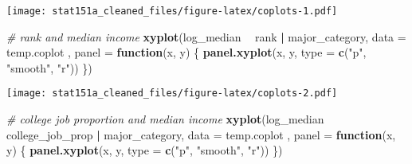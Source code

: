 \documentclass[
]{article}
\newenvironment{Shaded}{\begin{snugshade}}{\end{snugshade}}
\newcommand{\CommentTok}[1]{\textcolor[rgb]{0.56,0.35,0.01}{\textit{#1}}}
\newcommand{\ControlFlowTok}[1]{\textcolor[rgb]{0.13,0.29,0.53}{\textbf{#1}}}
\newcommand{\DataTypeTok}[1]{\textcolor[rgb]{0.13,0.29,0.53}{#1}}
\newcommand{\KeywordTok}[1]{\textcolor[rgb]{0.13,0.29,0.53}{\textbf{#1}}}
\newcommand{\NormalTok}[1]{#1}
\newcommand{\OperatorTok}[1]{\textcolor[rgb]{0.81,0.36,0.00}{\textbf{#1}}}
\newcommand{\StringTok}[1]{\textcolor[rgb]{0.31,0.60,0.02}{#1}}
\begin{document}
\begin{Shaded}
\end{Shaded}

\texttt{[image: stat151a\_cleaned\_files/figure-latex/coplots-1.pdf]}

\begin{Shaded}
\begin{Highlighting}[]
\CommentTok{# rank and median income }
\KeywordTok{xyplot}\NormalTok{(log_median }\OperatorTok{~}\StringTok{ }\NormalTok{rank }\OperatorTok{|}\StringTok{ }\NormalTok{major_category, }\DataTypeTok{data =}\NormalTok{ temp.coplot ,}
       \DataTypeTok{panel =} \ControlFlowTok{function}\NormalTok{(x, y) \{}
\KeywordTok{panel.xyplot}\NormalTok{(x, y, }\DataTypeTok{type =} \KeywordTok{c}\NormalTok{(}\StringTok{"p"}\NormalTok{, }\StringTok{"smooth"}\NormalTok{, }\StringTok{"r"}\NormalTok{))}
\NormalTok{\})}
\end{Highlighting}
\end{Shaded}

\texttt{[image: stat151a\_cleaned\_files/figure-latex/coplots-2.pdf]}

\begin{Shaded}
\begin{Highlighting}[]
\CommentTok{# college job proportion and median income }
\KeywordTok{xyplot}\NormalTok{(log_median }\OperatorTok{~}\StringTok{ }\NormalTok{college_job_prop }\OperatorTok{|}\StringTok{ }\NormalTok{major_category, }\DataTypeTok{data =}\NormalTok{ temp.coplot ,}
       \DataTypeTok{panel =} \ControlFlowTok{function}\NormalTok{(x, y) \{}
\KeywordTok{panel.xyplot}\NormalTok{(x, y, }\DataTypeTok{type =} \KeywordTok{c}\NormalTok{(}\StringTok{"p"}\NormalTok{, }\StringTok{"smooth"}\NormalTok{, }\StringTok{"r"}\NormalTok{))}
\NormalTok{\})}
\end{Highlighting}
\end{Shaded}
\end{document}
